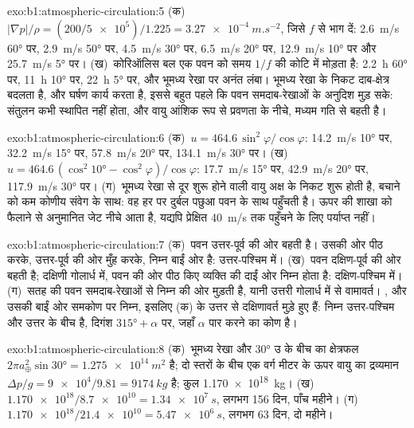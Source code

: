 \begin{solution}{exo:b1:atmospheric-circulation:5}
(क)~$|\nabla p|/\rho = (200/\num{5e5})/1.225 = \qty{3.27e-4}{m.s^{-2}}$, जिसे
$f$ से भाग दें: \qty{2.6}{m/s} \ang{60} पर, \qty{2.9}{m/s} \ang{50} पर, \qty{4.5}{m/s}
\ang{30} पर, \qty{6.5}{m/s} \ang{20} पर, \qty{12.9}{m/s} \ang{10} पर और
\qty{25.7}{m/s} \ang{5} पर। (ख)~कोरिऑलिस बल एक पवन को समय $1/f$ की कोटि में मोड़ता है:
\qty{2.2}{h} \ang{60} पर, \qty{11}{h} \ang{10} पर, \qty{22}{h} \ang{5} पर, और भूमध्य रेखा पर अनंत लंबा। भूमध्य रेखा के निकट दाब-क्षेत्र बदलता है, और घर्षण कार्य करता है, इससे बहुत पहले कि पवन समदाब-रेखाओं के अनुदिश मुड़ सके: संतुलन कभी स्थापित नहीं होता, और वायु आंशिक रूप से प्रवणता के नीचे, मध्यम गति से बहती है।
\end{solution}

\begin{solution}{exo:b1:atmospheric-circulation:6}
(क)~$u = 464.6\,\sin^2\varphi/\cos\varphi$: \qty{14.2}{m/s} \ang{10} पर, \qty{32.2}{m/s} \ang{15} पर, \qty{57.8}{m/s} \ang{20} पर, \qty{134.1}{m/s} \ang{30} पर। (ख)~$u = 464.6\,(\cos^2\ang{10} - \cos^2\varphi)/\cos\varphi$: \qty{17.7}{m/s} \ang{15} पर, \qty{42.9}{m/s} \ang{20} पर, \qty{117.9}{m/s} \ang{30} पर। (ग)~भूमध्य रेखा से दूर शुरू होने वाली वायु अक्ष के निकट शुरू होती है, बचाने को कम कोणीय संवेग के साथ: वह हर  पर दुर्बल पछुआ पवन के साथ पहुँचती है। ऊपर की शाखा को फैलाने से अनुमानित जेट नीचे आता है, यद्यपि प्रेक्षित \qty{40}{m/s} तक पहुँचने के लिए पर्याप्त नहीं।
\end{solution}

\begin{solution}{exo:b1:atmospheric-circulation:7}
(क)~पवन उत्तर-पूर्व की ओर बहती है। उसकी ओर पीठ करके, उत्तर-पूर्व की ओर मुँह करके, निम्न बाईं ओर है: उत्तर-पश्चिम में। (ख)~पवन दक्षिण-पूर्व की ओर बहती है; दक्षिणी गोलार्ध में, पवन की ओर पीठ किए व्यक्ति की दाईं ओर निम्न होता है: दक्षिण-पश्चिम में। (ग)~सतह की पवन समदाब-रेखाओं से निम्न की ओर मुड़ती है, यानी उत्तरी गोलार्ध में  से वामावर्त। , और उसकी बाईं ओर समकोण पर निम्न, इसलिए (क) के उत्तर से दक्षिणावर्त मुड़े हुए हैं: निम्न उत्तर-पश्चिम और उत्तर के बीच है, दिगंश $\ang{315} + \alpha$ पर, जहाँ $\alpha$ पार करने का कोण है।
\end{solution}

\begin{solution}{exo:b1:atmospheric-circulation:8}
(क)~भूमध्य रेखा और \ang{30} उ के बीच का क्षेत्रफल $2\pi a_\oplus^2\sin\ang{30} =
\qty{1.275e14}{m^2}$ है; दो स्तरों के बीच एक वर्ग मीटर के ऊपर वायु का द्रव्यमान $\Delta p/g = \num{9e4}/9.81 = \qty{9174}{kg}$ है; कुल
\qty{1.170e18}{kg}। (ख)~$\num{1.170e18}/\num{8.7e10} = \qty{1.34e7}{s}$, लगभग
\num{156} दिन, पाँच महीने। (ग)~$\num{1.170e18}/\num{21.4e10} = \qty{5.47e6}{s}$, लगभग \num{63} दिन, दो महीने।
\end{solution}

